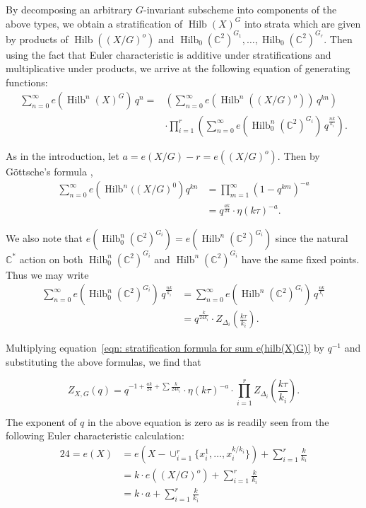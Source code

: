 \documentclass{article}
\theoremstyle{definition}
\newcommand{\CC} {{\mathbb C}}          %
\newcommand{\Hilb}{\operatorname{Hilb}}
\begin{document}
By decomposing an arbitrary $G$-invariant subscheme into components of
the above types, we obtain a stratification of $\Hilb (X)^{G}$ into
strata which are given by products of $\Hilb ((X/G)^{o})$ and
$\Hilb_{0}(\CC^{2})^{G_{1}},\dotsc ,\Hilb_{0}(\CC^{2})^{G_{r}}$. Then
using the fact that Euler characteristic is additive under
stratifications and multiplicative under products, we arrive at the
following equation of generating functions:
\begin{align}\label{eqn: stratification formula for sum e(hilb(X)G)}
\nonumber\sum_{n=0}^{\infty} e\left(\Hilb^{n}(X)^{G} \right)\, q^{n}
=&\left(\sum_{n=0}^{\infty} e\left(\Hilb^{n}((X/G)^{o}) \right)\,
q^{kn} \right)\\
& \cdot \prod_{i=1}^{r}\left( \sum_{n=0}^{\infty}
e\left(\Hilb_{0}^{n}(\CC^{2})^{G_{i}} \right) \, q^{\frac{nk}{k_{i}}}
\right) .
\end{align}

As in the introduction, let $a = e(X/G)-r=e\left((X/G)^{o}
\right)$. Then by G\"ottsche's formula \cite{gottsche1990betti},
\begin{align*}
\sum_{n=0}^{\infty} e\left(\Hilb^{n}((X/G)^{0} \right) q^{kn} &=
\prod_{m=1}^{\infty} (1-q^{km})^{-a}\\
&= q^{\frac{ak}{24}} \cdot \eta (k\tau )^{-a}. 
\end{align*}

We also note that $e\left(\Hilb_{0}^{n}(\CC^{2})^{G_{i}}
\right)=e\left(\Hilb^{n}(\CC^{2})^{G_{i}} \right)$ since the natural
$\CC^{*}$ action on both $\Hilb_{0}^{n}(\CC^{2})^{G_{i}}$ and
$\Hilb^{n}(\CC^{2})^{G_{i}}$ have the same fixed points. Thus we may
write
\begin{align*}
\sum_{n=0}^{\infty} e\left(\Hilb_{0}^{n}(\CC^{2})^{G_{i}} \right) \,
q^{\frac{nk}{k_{i}}} &= \sum_{n=0}^{\infty} e\left(\Hilb^{n}(\CC^{2})^{G_{i}} \right) \,
q^{\frac{nk}{k_{i}}}\\
&= q^{\frac{k}{24k_{i}}} \cdot Z_{\Delta_{i}} \left(\frac{k\tau}{k_{i}}
\right) .
\end{align*}

Multiplying equation~\eqref{eqn: stratification formula for sum
e(hilb(X)G)} by $q^{-1}$ and substituting the above formulas, we find
that

\[
Z_{X,G}(q) = q^{-1 +\frac{ak}{24} + \sum \frac{k}{24k_{i}} } \cdot 
\eta (k\tau )^{-a}\cdot 
\prod_{i=1}^{r}Z_{\Delta_{i}}\left(\frac{k\tau}{k_{i}} \right) .
\]

The exponent of $q$ in the above equation is zero as is readily seen
from the following Euler characteristic calculation:
\begin{align*}
24 = e(X) &= e\left(X-\cup_{i=1}^{r} \{x_{i}^{1},\dotsc
,x_{i}^{k/k_{i}} \} \right) + \sum_{i=1}^{r} \frac{k}{k_{i}} \\
&= k \cdot e\left((X/G)^{o} \right) + \sum_{i=1}^{r} \frac{k}{k_{i}} \\
&= k\cdot a + \sum_{i=1}^{r}\frac{k}{k_{i}} 
\end{align*}
\end{document}
